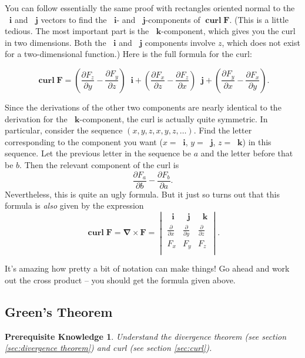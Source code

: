 \documentclass{myarticle}
\DeclareMathOperator{\curl}{\mathbf{curl}}
\renewcommand{\vec}[1]{\mathbf{#1}}
\newcommand{\unitvector}[1]{
  \mathop{}\!\vec{#1}
}
\newcommand{\ih}{\unitvector{i}}
\newcommand{\jh}{\unitvector{j}}
\newcommand{\kh}{\unitvector{k}}
\newcommand{\del}{\boldsymbol{\nabla}}
\theoremstyle{nospace}
\newtheorem*{oldprereq}{Prerequisite Knowledge}
\newenvironment{prereq}
{\begin{mdframed}\begin{oldprereq}}
    {\end{oldprereq}\end{mdframed}}
\newtheorem{old series theorem}{Theorem}
\newenvironment{series theorem}
{\begin{mdframed}\begin{old series theorem}}
    {\end{old series theorem}\end{mdframed}}
\begin{document}
You can follow essentially the same proof with rectangles oriented
normal to the $\ih$ and $\jh$ vectors to find the $\ih$- and
$\jh$-components of $\curl \vec{F}$. (This is a little tedious. The
most important part is the $\kh$-component, which gives you the curl
in two dimensions. Both the $\ih$ and $\jh$ components involve $z$,
which does not exist for a two-dimensional function.) Here is the full
formula for the curl:

\[
  \curl \vec{F}
  = \left(\frac{\partial F_z}{\partial y}
    - \frac{\partial F_y}{\partial z}\right) \ih
  + \left(\frac{\partial F_x}{\partial z}
    - \frac{\partial F_z}{\partial x}\right) \jh
  + \left(\frac{\partial F_y}{\partial x}
    - \frac{\partial F_x}{\partial y}\right).
\]

Since the derivations of the other two components are nearly identical
to the derivation for the $\kh$-component, the curl is actually quite
symmetric. In particular, consider the sequence
$(x, y, z, x, y, z, \dots)$. Find the letter corresponding to the
component you want ($x = \ih$, $y = \jh$, $z = \kh$) in this sequence.
Let the previous letter in the sequence be $a$ and the letter before
that be $b$. Then the relevant component of the curl is
\[
  \frac{\partial F_a}{\partial b} - \frac{\partial F_b}{\partial a}.
\]
Nevertheless, this is quite an ugly formula. But it just so turns out
that this formula is \textit{also} given by the expression
\[
  \curl \vec{F} = \del \times \vec{F} = \begin{vmatrix}
    \ih & \jh & \kh \\
    \frac{\partial}{\partial x} &
    \frac{\partial}{\partial y} &
    \frac{\partial}{\partial z} \\
    F_x & F_y & F_z \\
  \end{vmatrix}.
\]

It's amazing how pretty a bit of notation can make things! Go ahead
and work out the cross product -- you should get the formula given
above.

\subsection{Green's Theorem}
\label{sec:greens theorem}

\begin{prereq}
  Understand the divergence theorem (see section \ref{sec:divergence
    theorem}) and curl (see section \ref{sec:curl}).
\end{prereq}
\end{document}
